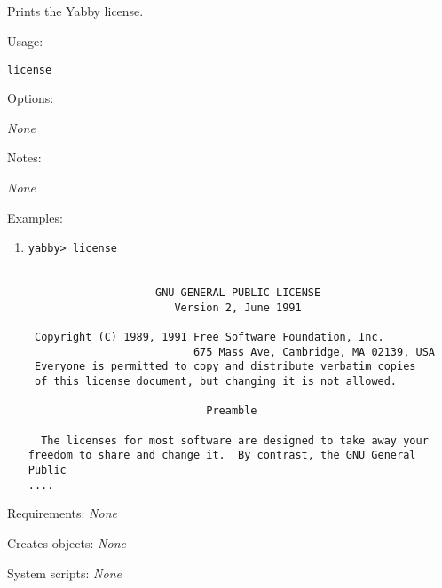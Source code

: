 


\subsection[license]{  }



Prints the Yabby license.


\begin{description}


\item{Usage:}

{\tt license}


\item{Options:}
\begin{description}
{\em None}
\end{description}


\item{Notes:}
\begin{enumerate}
{\em None}
\end{enumerate}


\item{Examples:}
\begin{enumerate}

\item
\begin{verbatim}
yabby> license


                    GNU GENERAL PUBLIC LICENSE
                       Version 2, June 1991

 Copyright (C) 1989, 1991 Free Software Foundation, Inc.
                          675 Mass Ave, Cambridge, MA 02139, USA
 Everyone is permitted to copy and distribute verbatim copies
 of this license document, but changing it is not allowed.

                            Preamble

  The licenses for most software are designed to take away your
freedom to share and change it.  By contrast, the GNU General Public
....
\end{verbatim}

\end{enumerate}


\item{Requirements:} {\em None}


\item{Creates objects:} {\em None}


\item{System scripts:} {\em None}

\end{description}

